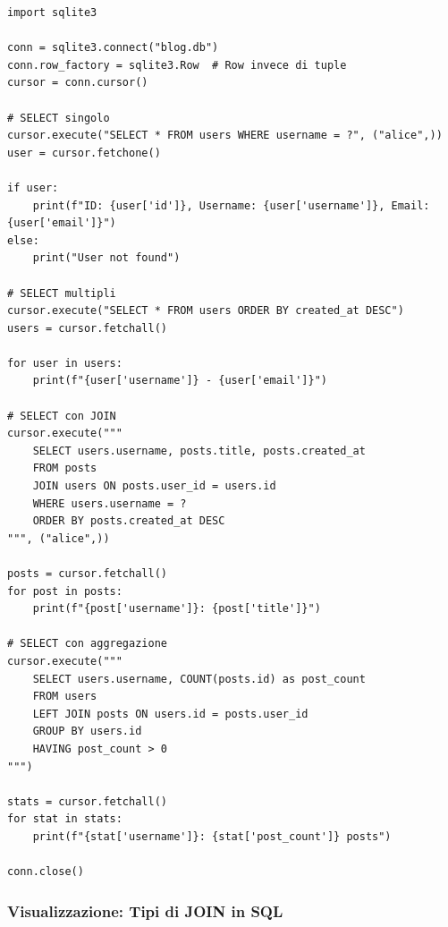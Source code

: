 \begin{lstlisting}
import sqlite3

conn = sqlite3.connect("blog.db")
conn.row_factory = sqlite3.Row  # Row invece di tuple
cursor = conn.cursor()

# SELECT singolo
cursor.execute("SELECT * FROM users WHERE username = ?", ("alice",))
user = cursor.fetchone()

if user:
    print(f"ID: {user['id']}, Username: {user['username']}, Email: {user['email']}")
else:
    print("User not found")

# SELECT multipli
cursor.execute("SELECT * FROM users ORDER BY created_at DESC")
users = cursor.fetchall()

for user in users:
    print(f"{user['username']} - {user['email']}")

# SELECT con JOIN
cursor.execute("""
    SELECT users.username, posts.title, posts.created_at
    FROM posts
    JOIN users ON posts.user_id = users.id
    WHERE users.username = ?
    ORDER BY posts.created_at DESC
""", ("alice",))

posts = cursor.fetchall()
for post in posts:
    print(f"{post['username']}: {post['title']}")

# SELECT con aggregazione
cursor.execute("""
    SELECT users.username, COUNT(posts.id) as post_count
    FROM users
    LEFT JOIN posts ON users.id = posts.user_id
    GROUP BY users.id
    HAVING post_count > 0
""")

stats = cursor.fetchall()
for stat in stats:
    print(f"{stat['username']}: {stat['post_count']} posts")

conn.close()
\end{lstlisting}

\subsubsection{Visualizzazione: Tipi di JOIN in SQL}

